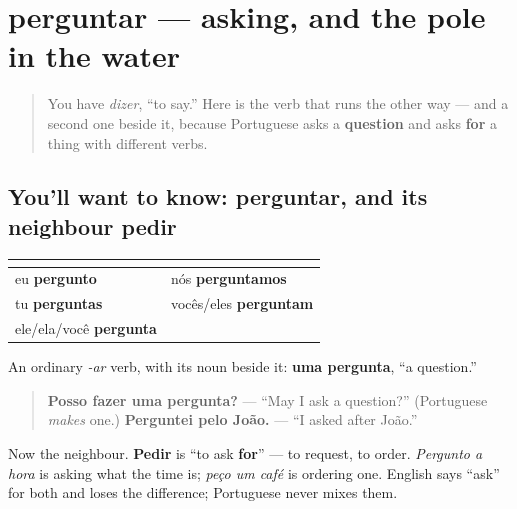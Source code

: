 \section[perguntar]{perguntar — asking, and the pole in the water}

\label{lesson:PT-C19-perguntar}



\begin{quote}
You have \emph{dizer}, \textquotedblleft{}to say.\textquotedblright{} Here is the verb that runs the other way — and a second one beside it, because Portuguese asks a \textbf{question} and asks \textbf{for} a thing with different verbs.
\end{quote}

\subsection*{You'll want to know: perguntar, and its neighbour pedir}
\noindent
\begin{tabularx}{\linewidth}{@{}>{\raggedright\arraybackslash}X>{\raggedright\arraybackslash}X@{}}
\toprule
\textbf{} & \textbf{} \\
\midrule
eu \textbf{pergunto} & nós \textbf{perguntamos} \\
tu \textbf{perguntas} & vocês/eles \textbf{perguntam} \\
ele/ela/você \textbf{pergunta} &  \\
\bottomrule
\end{tabularx}

An ordinary \emph{-ar} verb, with its noun beside it: \textbf{uma pergunta}, \textquotedblleft{}a question.\textquotedblright{}

\begin{quote}
\textbf{Posso fazer uma pergunta?} — \textquotedblleft{}May I ask a question?\textquotedblright{} (Portuguese \emph{makes} one.) \textbf{Perguntei pelo João.} — \textquotedblleft{}I asked after João.\textquotedblright{}
\end{quote}

Now the neighbour. \textbf{Pedir} is \textquotedblleft{}to ask \textbf{for}\textquotedblright{} — to request, to order. \emph{Pergunto a hora} is asking what the time is; \emph{peço um café} is ordering one. English says \textquotedblleft{}ask\textquotedblright{} for both and loses the difference; Portuguese never mixes them.

